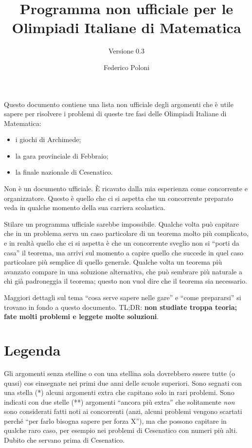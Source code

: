 \documentclass[a4paper,10pt]{paper}
\date{}
\title{Programma non ufficiale per le Olimpiadi Italiane di Matematica}
\subtitle{Versione 0.3}
\author{Federico Poloni}
\renewcommand{\star}{(*)}
\newcommand{\sstar}{(**)}
\begin{document}
 \maketitle
 
 Questo documento contiene una lista non ufficiale degli argomenti che è utile sapere per risolvere i problemi di queste tre fasi delle Olimpiadi Italiane di Matematica:
 \begin{itemize}
  \item i giochi di Archimede;
  \item la gara provinciale di Febbraio;
  \item la finale nazionale di Cesenatico.
 \end{itemize}

 Non è un documento ufficiale. È ricavato dalla mia esperienza come concorrente e organizzatore. Questo è quello che ci si aspetta che un concorrente preparato veda in qualche momento della sua carriera scolastica.
 
 Stilare un programma ufficiale sarebbe impossibile. Qualche volta può capitare che in un problema serva un caso particolare di un teorema molto più complicato, e in realtà quello che ci si aspetta è che un concorrente sveglio non si ``porti da casa'' il teorema, ma arrivi sul momento a capire quello che succede in quel caso particolare più semplice di quello generale. Qualche volta un teorema più avanzato compare in una soluzione alternativa, che può sembrare più naturale a chi già padroneggia il teorema; questo non vuol dire che il teorema sia necessario.

 Maggiori dettagli sul tema ``cosa serve sapere nelle gare'' e ``come prepararsi'' si trovano in fondo a questo documento. TL;DR: \textbf{non studiate troppa teoria; fate molti problemi e leggete molte soluzioni}.
 
\section{Legenda}
Gli argomenti senza stelline o con una stellina sola dovrebbero essere tutte (o quasi) cos einsegnate nei primi due anni delle scuole superiori. Sono segnati con una stella \star{} alcuni argomenti extra che capitano solo in rari problemi. Sono indicati con due stelle \sstar{} argomenti ``ancora più extra'' che solitamente \emph{non} sono considerati fatti noti ai concorrenti (anzi, alcuni problemi vengono scartati perché ``per farlo bisogna sapere per forza X''), ma che possono capitare in qualche raro caso, per esempio nei problemi di Cesenatico con numeri più alti. Dubito che servano prima di Cesenatico.
\end{document}
